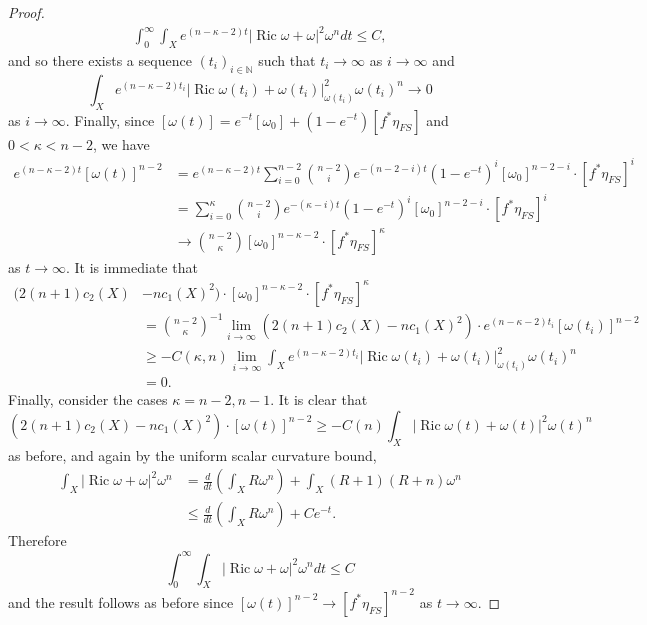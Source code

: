 \documentclass[12pt]{article}
\numberwithin{equation}{section}
\newcommand{\N}{\mathbb{N}}
\DeclareMathOperator{\Ric}{Ric}
\begin{document}
\begin{proof}
\begin{align*}
    \int_0^\infty \int_X e^{(n-\kappa-2)t} |\Ric \omega + \omega|^2 \omega^n dt \leq C,
\end{align*}
and so there exists a sequence $(t_i)_{i \in \N}$ such that $t_i \to \infty$ as $i \to \infty$ and 
\begin{equation*}
    \int_X e^{(n-\kappa-2)t_i} |\Ric \omega(t_i) + \omega(t_i)|_{\omega(t_i)}^2 \omega(t_i)^n \to 0
\end{equation*}
as $i \to \infty$. Finally, since $[\omega(t)] = e^{-t}[\omega_0] + (1-e^{-t}) [f^*\eta_{FS}]$ and $0 < \kappa < n - 2$, we have
\begin{align*}
    e^{(n-\kappa-2)t} [\omega(t)]^{n-2} &= e^{(n-\kappa-2)t} \sum_{i=0}^{n-2} {n-2 \choose i} e^{-(n-2-i)t} (1-e^{-t})^{i} [\omega_0]^{n-2-i} \cdot [f^*\eta_{FS}]^i\\
    &= \sum_{i=0}^{\kappa} {n-2 \choose i} e^{-(\kappa-i)t} (1-e^{-t})^{i} [\omega_0]^{n-2-i} \cdot [f^*\eta_{FS}]^i\\
    &\to {n-2 \choose \kappa} [\omega_0]^{n-\kappa-2} \cdot [f^*\eta_{FS}]^{\kappa}
\end{align*}
as $t \to \infty$. It is immediate that
\begin{align*}
     (2 (n+1) c_2(X) &- n c_1(X)^2) \cdot [\omega_0]^{n-\kappa-2} \cdot [f^*\eta_{FS}]^{\kappa}\\
    &= {n-2 \choose \kappa}^{-1}\lim_{i \to \infty} (2 (n+1) c_2(X) - n c_1(X)^2) \cdot e^{(n-\kappa-2)t_i}[\omega(t_i)]^{n-2}\\
    &\geq - C(\kappa,n) \lim_{i \to \infty} \int_X e^{(n-\kappa-2)t_i} |\Ric \omega(t_i) + \omega(t_i)|_{\omega(t_i)}^2 \omega(t_i)^n\\
    &= 0.
\end{align*}
Finally, consider the cases $\kappa = n-2, n-1$. It is clear that
\begin{equation*}
    \left(2(n+1) c_2(X) - n c_1(X)^2 \right)\cdot [\omega(t)]^{n-2} \geq -C(n) \int_X |\Ric \omega(t) + \omega(t)|^2 \omega(t)^n
\end{equation*}
as before, and again by the uniform scalar curvature bound,
\begin{align*}
    \int_X |\Ric \omega + \omega|^2 \omega^n &= \frac{d}{dt} \left(\int_X R \omega^n\right) + \int_X (R+1)(R+n) \omega^n\\
    &\leq \frac{d}{dt} \left(\int_X R \omega^n\right) + C e^{-t}.
\end{align*}
Therefore 
\begin{equation*}
    \int_0^\infty \int_X |\Ric \omega + \omega|^2 \omega^n dt \leq C
\end{equation*}
and the result follows as before since $[\omega(t)]^{n-2} \to [f^*\eta_{FS}]^{n-2}$ as $t \to \infty$.
\end{proof}
\end{document}
